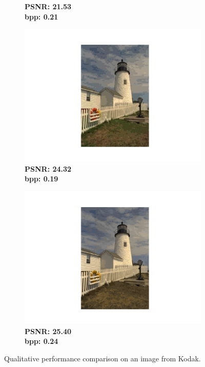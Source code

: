 \begin{figure}[t]
\begin{subfigure}{.19\textwidth}
        \vspace{-15pt}
        \caption*{\tiny \textbf{PSNR: 21.53 \\ bpp: 0.21}}
	\end{subfigure}
    \begin{subfigure}{.19\textwidth}
		\centering
		\includegraphics[trim=5cm 1.5cm 5cm 1.7cm, clip, width=1\textwidth]{figures/kodim19_IMF_bpp_0.191.pdf}
        \vspace{-15pt}
        \caption*{\tiny \textbf{PSNR: 24.32 \\ bpp: 0.19}}
	\end{subfigure}
    \begin{subfigure}{.19\textwidth}
		\centering
		\includegraphics[trim=5cm 1.5cm 5cm 1.7cm, clip, width=1\textwidth]{figures/kodim19_IMF - RGB_bpp_0.247.pdf}
        \vspace{-15pt}
        \caption*{\tiny \textbf{PSNR: 25.40 \\ bpp: 0.24}}
	\end{subfigure}
    \caption{Qualitative performance comparison on an image from Kodak.}
	\label{fig:qualitative_comparison_kodim19}
\end{figure}


